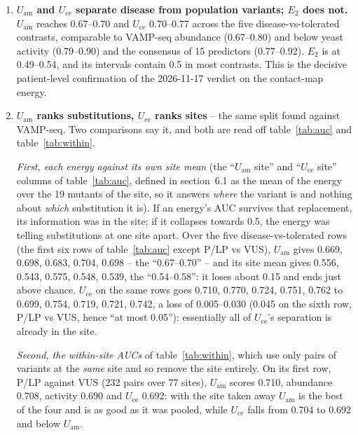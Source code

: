 \documentclass[11pt,a4paper]{article}
\newcommand{\Uam}{U_{\mathrm{am}}}
\newcommand{\Uce}{U_{\mathrm{ce}}}
\newcommand{\Etwo}{E_{2}}
\begin{document}
\begin{enumerate}
\item \textbf{$\Uam$ and $\Uce$ separate disease from population variants;
  $\Etwo$ does not.} $\Uam$ reaches 0.67--0.70 and $\Uce$ 0.70--0.77 across the
  five disease-vs-tolerated contrasts, comparable to VAMP-seq abundance
  (0.67--0.80) and below yeast activity (0.79--0.90) and the consensus of 15
  predictors (0.77--0.92). $\Etwo$ is at 0.49--0.54, and its intervals contain
  0.5 in most contrasts. This is the decisive patient-level confirmation of the
  2026-11-17 verdict on the contact-map energy.
\item \textbf{$\Uam$ ranks substitutions, $\Uce$ ranks sites} -- the same
  split found against VAMP-seq. Two comparisons say it, and both are read off
  table~\ref{tab:auc} and table~\ref{tab:within}.

  \emph{First, each energy against its own site mean} (the ``$\Uam$ site'' and
  ``$\Uce$ site'' columns of table~\ref{tab:auc}, defined in section~6.1 as
  the mean of the energy over the 19 mutants of the site, so it answers
  \emph{where} the variant is and nothing about \emph{which} substitution it
  is). If an energy's AUC survives that replacement, its information was in
  the site; if it collapses towards 0.5, the energy was telling substitutions
  at one site apart. Over the five disease-vs-tolerated rows (the first six
  rows of table~\ref{tab:auc} except P/LP vs VUS), $\Uam$ gives 0.669, 0.698,
  0.683, 0.704, 0.698 -- the ``0.67--0.70'' -- and its site mean gives 0.556,
  0.543, 0.575, 0.548, 0.539, the ``0.54--0.58'': it loses about 0.15 and ends
  just above chance. $\Uce$ on the same rows goes 0.710, 0.770, 0.724, 0.751,
  0.762 to 0.699, 0.754, 0.719, 0.721, 0.742, a loss of 0.005--0.030 (0.045 on
  the sixth row, P/LP vs VUS, hence ``at most 0.05''): essentially all of
  $\Uce$'s separation is already in the site.

  \emph{Second, the within-site AUCs} of table~\ref{tab:within}, which use
  only pairs of variants at the \emph{same} site and so remove the site
  entirely. On its first row, P/LP against VUS (232 pairs over 77 sites),
  $\Uam$ scores 0.710, abundance 0.708, activity 0.690 and $\Uce$ 0.692: with
  the site taken away $\Uam$ is the best of the four and is as good as it was
  pooled, while $\Uce$ falls from 0.704 to 0.692 and below $\Uam$.


\end{enumerate}
\end{document}
